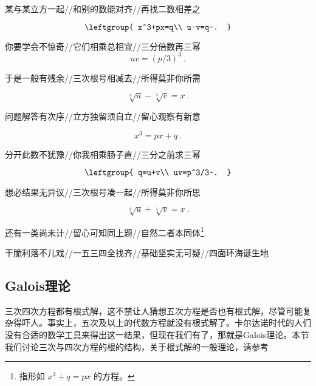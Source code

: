 某与某立方一起//和别的数能对齐//再找二数相差之

\begin{equation}
\leftgroup{
    x^3+px=q\\
    u-v=q~.
}
\end{equation}

你要学会不惊奇//它们相乘总相宜//三分倍数再三幂
\begin{equation}
uv=(p/3)^3~.
\end{equation}

于是一般有残余//三次根号相减去//所得莫非你所需

\begin{equation}
\sqrt[3]{u}-\sqrt[3]{v}=x~.
\end{equation}


问题解答有次序//立方独留须自立//留心观察有新意

\begin{equation}
x^3=px+q~.
\end{equation}

分开此数不犹豫//你我相乘肠子直//三分之前求三幂

\begin{equation}
\leftgroup{
    q=u+v\\
    uv=p^3/3~.
}
\end{equation}

想必结果无异议//三次根号凑一起//所得莫非你所思

\begin{equation}
\sqrt[3]{u}+\sqrt[3]{v}=x~.
\end{equation}


还有一类尚未计//留心可知同上题//自然二者本同体\footnote{指形如
$
x^3+q=px
$
的方程。}


干脆利落不儿戏//一五三四全找齐//基础坚实无可疑//四面环海诞生地






\subsection{Galois理论}\label{sub_PlyRtS_1}

三次四次方程都有根式解，这不禁让人猜想五次方程是否也有根式解，尽管可能复杂得吓人。事实上，五次及以上的代数方程就没有根式解了。卡尔达诺时代的人们没有合适的数学工具来得出这一结果，但现在我们有了，那就是Galois理论。本节我们讨论三次与四次方程的根的结构，关于根式解的一般理论，请参考








